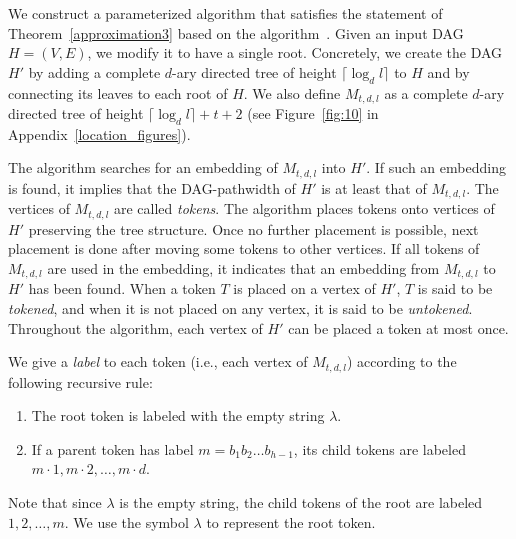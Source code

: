\documentclass[runningheads]{llncs}
\theoremstyle{plain}
\theoremstyle{definition}
\begin{document}
We construct a parameterized algorithm that satisfies the statement of Theorem~\ref{approximation3} based on the algorithm~\cite{art8}. Given an input DAG $H = (V, E)$, we modify it to have a single root. Concretely, we create the DAG $H'$ by adding a complete $d$-ary directed tree of height $\lceil \log_d l \rceil$ to $H$ and by connecting its leaves to each root of $H$. We also define $M_{t, d, l}$ as a complete $d$-ary directed tree of height $\lceil \log_d l \rceil +t+2$ (see Figure~\ref{fig:10} in Appendix~\ref{location_figures}).


The algorithm searches for an embedding of $M_{t, d, l}$ into $H'$. If such an embedding is found, it implies that the DAG-pathwidth of $H'$ is at least that of $M_{t, d, l}$. The vertices of $M_{t, d, l}$ are called \emph{tokens}. The algorithm places tokens onto vertices of $H'$ preserving the tree structure. Once no further placement is possible, next placement is done after moving some tokens to other vertices. If all tokens of $M_{t, d, l}$ are used in the embedding, it indicates that an embedding from $M_{t, d, l}$ to $H'$ has been found. When a token $T$ is placed on a vertex of $H'$, $T$ is said to be \textit{tokened}, and when it is not placed on any vertex, it is said to be \textit{untokened}. Throughout the algorithm, each vertex of $H'$ can be placed a token at most once.

We give a \emph{label} to each token (i.e., each vertex of $M_{t, d, l}$) according to the following recursive rule:

\begin{enumerate}
    \item The root token is labeled with the empty string $\lambda$.
    \item If a parent token has label $m=b_1 b_2 \dots b_{h-1}$, its child tokens are labeled $m \cdot 1, m \cdot 2, \dots, m \cdot d$.
\end{enumerate}
%
Note that since $\lambda$ is the empty string, the child tokens of the root are labeled $1,2, \dots, m$. We use the symbol $\lambda$ to represent the root token.
\end{document}
